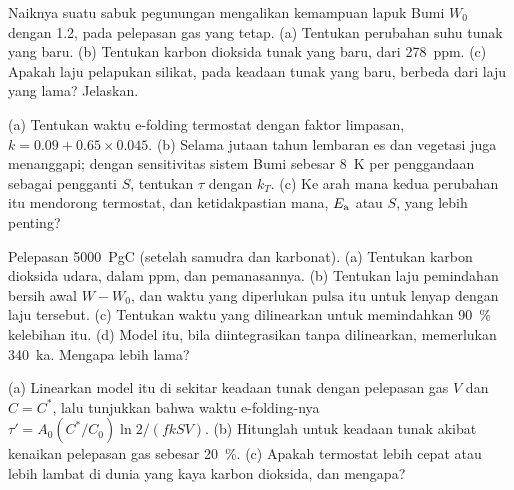 \begin{exercise}[$\star\star$]\label{exo:b2:deep-time-climate:9}
Naiknya suatu sabuk pegunungan mengalikan kemampuan lapuk Bumi $W_0$ dengan 1.2, pada pelepasan
gas yang tetap. (a) Tentukan perubahan suhu tunak yang baru. (b) Tentukan karbon dioksida tunak yang baru, dari
\qty{278}{ppm}. (c) Apakah laju pelapukan silikat, pada keadaan tunak yang baru, berbeda dari
laju yang lama? Jelaskan.
\end{exercise}

\begin{exercise}[$\star\star\star$]\label{exo:b2:deep-time-climate:10}
(a) Tentukan waktu e-folding termostat dengan faktor limpasan, $k = 0.09 + 0.65\times0.045$.
(b) Selama jutaan tahun lembaran es dan vegetasi juga menanggapi; dengan sensitivitas sistem
Bumi sebesar \qty{8}{K} per penggandaan sebagai pengganti $S$, tentukan $\tau$ dengan $k_T$. (c) Ke arah mana kedua
perubahan itu mendorong termostat, dan ketidakpastian mana, $E_{\text a}$ atau $S$, yang lebih penting?
\end{exercise}

\begin{exercise}[$\star\star\star$]\label{exo:b2:deep-time-climate:11}
Pelepasan \qty{5000}{PgC} (setelah samudra dan karbonat). (a) Tentukan karbon dioksida
udara, dalam ppm, dan pemanasannya. (b) Tentukan laju pemindahan bersih awal $W - W_0$, dan waktu yang diperlukan
pulsa itu untuk lenyap dengan laju tersebut. (c) Tentukan waktu yang dilinearkan untuk memindahkan \qty{90}{\percent}
kelebihan itu. (d) Model itu, bila diintegrasikan tanpa dilinearkan, memerlukan \qty{340}{ka}. Mengapa lebih lama?
\end{exercise}

\begin{exercise}[$\star\star\star$]\label{exo:b2:deep-time-climate:12}
(a) Linearkan model itu di sekitar keadaan tunak dengan pelepasan gas $V$ dan $C = C^*$, lalu tunjukkan bahwa
waktu e-folding-nya $\tau' = A_0 (C^*/C_0)\ln 2/(f k S V)$. (b) Hitunglah untuk keadaan tunak
akibat kenaikan pelepasan gas sebesar \qty{20}{\percent}. (c) Apakah termostat lebih cepat atau lebih lambat di dunia yang kaya
karbon dioksida, dan mengapa?
\end{exercise}

